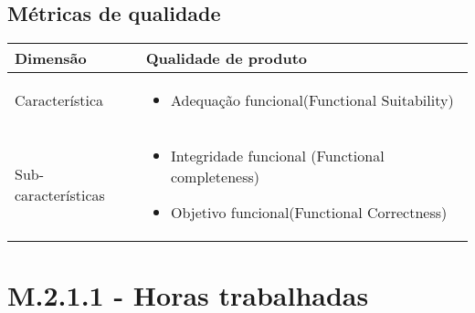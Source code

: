 	\subsection{Métricas de qualidade}

	\begin{tabular}{ |p{4cm}|p{8cm}| }
		\hline
	   Dimensão 		& 	Qualidade de produto	 \\
	 \hline
	 Característica 		& 	\begin{itemize} \item Adequação funcional(Functional Suitability) \end{itemize}	 \\
	 \hline
	 Sub-características 		& 	\begin{itemize} \item Integridade funcional (Functional completeness) \item Objetivo funcional(Functional Correctness) \end{itemize} \\
	 \hline
	\end{tabular}

\section{M.2.1.1 - Horas trabalhadas} %

